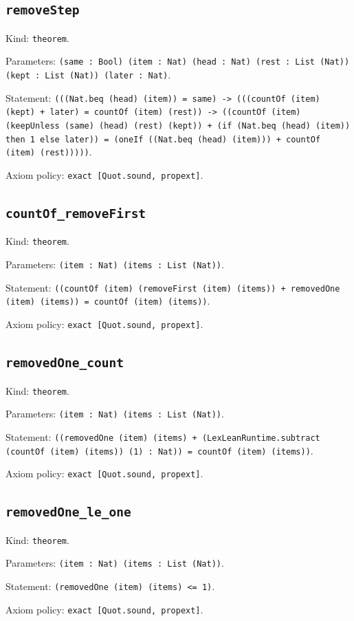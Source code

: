 \documentclass[11pt]{article}
\begin{document}
\subsection*{\texttt{removeStep}}
\noindent Kind: \texttt{theorem}.\par
\noindent Parameters: \texttt{(same : Bool) (item : Nat) (head : Nat) (rest : List (Nat)) (kept : List (Nat)) (later : Nat)}.\par
\noindent Statement: \texttt{(((Nat.beq (head) (item)) = same) -> (((countOf (item) (kept) + later) = countOf (item) (rest)) -> ((countOf (item) (keepUnless (same) (head) (rest) (kept)) + (if (Nat.beq (head) (item)) then 1 else later)) = (oneIf ((Nat.beq (head) (item))) + countOf (item) (rest)))))}.\par
\noindent Axiom policy: \texttt{exact [Quot.sound, propext]}.\par
\subsection*{\texttt{countOf\_removeFirst}}
\noindent Kind: \texttt{theorem}.\par
\noindent Parameters: \texttt{(item : Nat) (items : List (Nat))}.\par
\noindent Statement: \texttt{((countOf (item) (removeFirst (item) (items)) + removedOne (item) (items)) = countOf (item) (items))}.\par
\noindent Axiom policy: \texttt{exact [Quot.sound, propext]}.\par
\subsection*{\texttt{removedOne\_count}}
\noindent Kind: \texttt{theorem}.\par
\noindent Parameters: \texttt{(item : Nat) (items : List (Nat))}.\par
\noindent Statement: \texttt{((removedOne (item) (items) + (LexLeanRuntime.subtract (countOf (item) (items)) (1) : Nat)) = countOf (item) (items))}.\par
\noindent Axiom policy: \texttt{exact [Quot.sound, propext]}.\par
\subsection*{\texttt{removedOne\_le\_one}}
\noindent Kind: \texttt{theorem}.\par
\noindent Parameters: \texttt{(item : Nat) (items : List (Nat))}.\par
\noindent Statement: \texttt{(removedOne (item) (items) <= 1)}.\par
\noindent Axiom policy: \texttt{exact [Quot.sound, propext]}.\par
\end{document}
